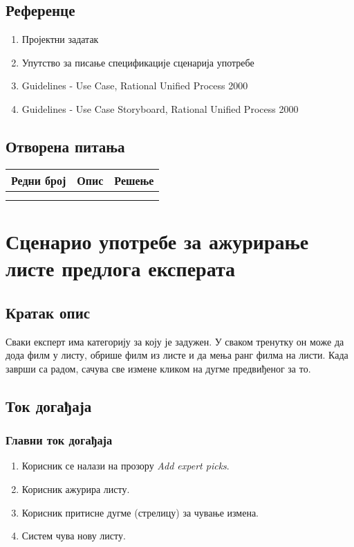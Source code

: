 \documentclass[12pt,a4paper]{article}
\begin{document}
\subsection{Референце}
 
\begin{enumerate}
  \item Пројектни задатак
  \item Упутство за писање спецификације сценарија употребе
  \item Guidelines - Use Case, Rational Unified Process 2000
  \item Guidelines - Use Case Storyboard, Rational Unified Process 2000
\end{enumerate}

\subsection{Отворена питања}

\noindent
\setcellgapes{4pt}
\makegapedcells
\begin{tabularx}{\linewidth}{|l|X|X|}
    \hline
    \textbf{Редни број} & \textbf{Опис} & \textbf{Решење} \\
    \hline
     &  &  \\
    \hline
    & &  \\
    \hline
\end{tabularx}
\section{Сценарио употребе за ажурирање листе предлога експерата}
\subsection{Кратак опис}
Сваки експерт има категорију за коју је задужен. У сваком тренутку он може да дода филм у листу, обрише филм из листе и да мења ранг филма на листи. Када заврши са радом, сачува све измене кликом на дугме предвиђеног за то.



\subsection{Ток догађаја}

   \subsubsection{Главни ток догађаја} 
 \begin{enumerate}
        \item {Корисник се налази на прозору \textit{Add expert picks}.}
        \item {Корисник ажурира листу.}
        \item {Корисник притисне дугме (стрелицу) за чување измена.}
        \item {Систем чува нову листу.} \newline
   
\end{enumerate}
\end{document}
